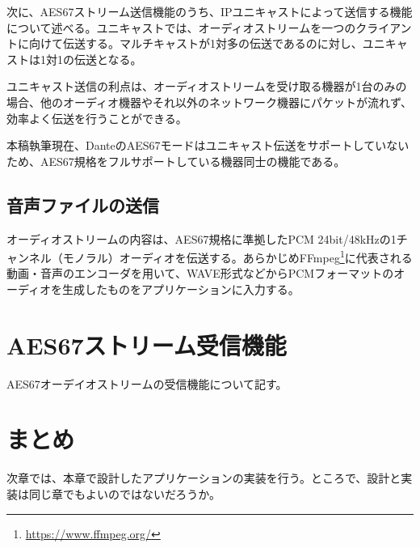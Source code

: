 次に、AES67ストリーム送信機能のうち、IPユニキャストによって送信する機能について述べる。ユニキャストでは、オーディオストリームを一つのクライアントに向けて伝送する。マルチキャストが1対多の伝送であるのに対し、ユニキャストは1対1の伝送となる。

ユニキャスト送信の利点は、オーディオストリームを受け取る機器が1台のみの場合、他のオーディオ機器やそれ以外のネットワーク機器にパケットが流れず、効率よく伝送を行うことができる。

本稿執筆現在、DanteのAES67モードはユニキャスト伝送をサポートしていないため、AES67規格をフルサポートしている機器同士の機能である。

\subsection{音声ファイルの送信}

オーディオストリームの内容は、AES67規格に準拠したPCM 24bit/48kHzの1チャンネル（モノラル）オーディオを伝送する。あらかじめFFmpeg\footnote{\url{https://www.ffmpeg.org/}}に代表される動画・音声のエンコーダを用いて、WAVE形式などからPCMフォーマットのオーディオを生成したものをアプリケーションに入力する。

\section{AES67ストリーム受信機能}

AES67オーデイオストリームの受信機能について記す。

\section{まとめ}

次章では、本章で設計したアプリケーションの実装を行う。ところで、設計と実装は同じ章でもよいのではないだろうか。

